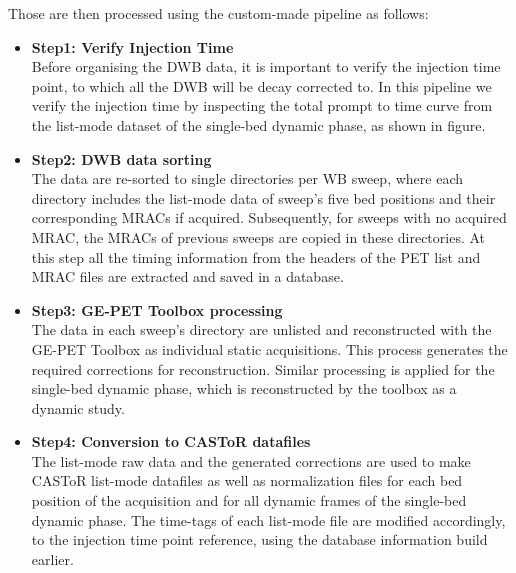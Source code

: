 Those are then processed using the custom-made pipeline as follows:
\begin{itemize}
    \item \textbf{Step1: Verify Injection Time} \\
    Before organising the DWB data, it is important to verify the injection time point, to which all the DWB will be decay corrected to. 
    In this pipeline we verify the injection time by inspecting the total prompt to time curve from the list-mode dataset of the single-bed dynamic phase, as shown in figure. 
    \item \textbf{Step2: DWB data sorting} \\
    The data are re-sorted to single directories per WB sweep, where each directory includes the list-mode data of sweep's five bed positions and their corresponding MRACs if acquired. Subsequently, for sweeps with no acquired MRAC, the MRACs of previous sweeps are copied in these directories.
    At this step all the timing information from the headers of the PET list and MRAC files are extracted and saved in a database. 
    \item \textbf{Step3: GE-PET Toolbox processing } \\
    The data in each sweep's directory are unlisted and reconstructed with the GE-PET Toolbox as individual static acquisitions. This process generates the required corrections for reconstruction. Similar processing is applied for the single-bed dynamic phase, which is reconstructed by the toolbox as a dynamic study.
    \item \textbf{Step4: Conversion to CASToR datafiles} \\
    The list-mode raw data and the generated corrections are used to make CASToR list-mode datafiles as well as normalization files for each bed position of the acquisition and for all dynamic frames of the single-bed dynamic phase. 
    The time-tags of each list-mode file are modified accordingly, to the injection time point reference, using the database information build earlier. 
\end{itemize}

